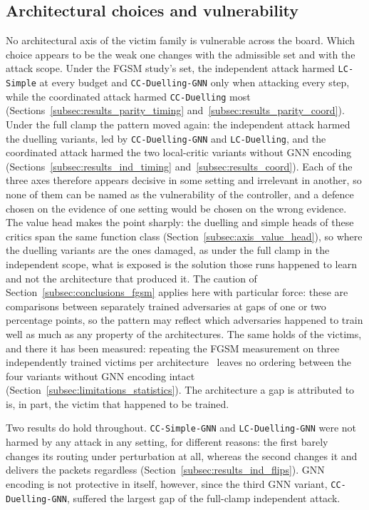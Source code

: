 \subsection{Architectural choices and vulnerability}
\label{subsec:conclusions_architecture}

No architectural axis of the victim family is vulnerable across the board. Which choice
appears to be the weak one changes with the admissible set and with the attack scope.
Under the FGSM study's set, the independent attack harmed \texttt{LC-Simple} at every
budget and \texttt{CC-Duelling-GNN} only when attacking every step, while the
coordinated attack harmed \texttt{CC-Duelling} most
(Sections~\ref{subsec:results_parity_timing} and~\ref{subsec:results_parity_coord}).
Under the full clamp the pattern moved again: the independent attack harmed the duelling
variants, led by \texttt{CC-Duelling-GNN} and \texttt{LC-Duelling}, and the coordinated
attack harmed the two local-critic variants without GNN encoding
(Sections~\ref{subsec:results_ind_timing} and~\ref{subsec:results_coord}). Each of the
three axes therefore appears decisive in some setting and irrelevant in another, so none
of them can be named as the vulnerability of the controller, and a defence chosen on the
evidence of one setting would be chosen on the wrong evidence. The value head makes the
point sharply: the duelling and simple heads of these critics span the same function
class (Section~\ref{subsec:axis_value_head}), so where the duelling variants are the
ones damaged, as under the full clamp in the independent scope, what is exposed is the
solution those runs happened to learn and not the architecture that produced it. The
caution of
Section~\ref{subsec:conclusions_fgsm} applies here with particular force: these are
comparisons between separately trained adversaries at gaps of one or two percentage
points, so the pattern may reflect which adversaries happened to train well as much as
any property of the architectures. The same holds of the victims, and there it has been
measured: repeating the FGSM measurement on three independently trained victims per
architecture~\cite{martins2026fgsm} leaves no ordering between the four variants without
GNN encoding intact (Section~\ref{subsec:limitations_statistics}). The architecture a gap is attributed to
is, in part, the victim that happened to be trained.

Two results do hold throughout. \texttt{CC-Simple-GNN} and \texttt{LC-Duelling-GNN} were
not harmed by any attack in any setting, for different reasons: the first barely changes
its routing under perturbation at all, whereas the second changes it and delivers the
packets regardless (Section~\ref{subsec:results_ind_flips}). GNN encoding is not
protective in itself, however, since the third GNN variant,
\texttt{CC-Duelling-GNN}, suffered the largest gap of the full-clamp independent attack.

